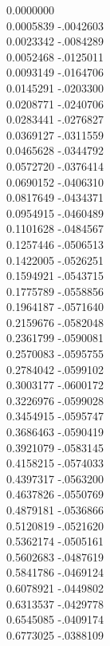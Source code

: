 \documentclass[12pt]{article}
\begin{document}
\begin{multicols}{2}
 0.0000000\\
 0.0005839 -.0042603\\
 0.0023342 -.0084289\\
 0.0052468 -.0125011\\
 0.0093149 -.0164706\\
 0.0145291 -.0203300\\
 0.0208771 -.0240706\\
 0.0283441 -.0276827\\
 0.0369127 -.0311559\\
 0.0465628 -.0344792\\
 0.0572720 -.0376414\\
 0.0690152 -.0406310\\
 0.0817649 -.0434371\\
 0.0954915 -.0460489\\
 0.1101628 -.0484567\\
 0.1257446 -.0506513\\
 0.1422005 -.0526251\\
 0.1594921 -.0543715\\
 0.1775789 -.0558856\\
 0.1964187 -.0571640\\
 0.2159676 -.0582048\\
 0.2361799 -.0590081\\
 0.2570083 -.0595755\\
 0.2784042 -.0599102\\
 0.3003177 -.0600172\\
 0.3226976 -.0599028\\
 0.3454915 -.0595747\\
 0.3686463 -.0590419\\
 0.3921079 -.0583145\\
 0.4158215 -.0574033\\
 0.4397317 -.0563200\\
 0.4637826 -.0550769\\
 0.4879181 -.0536866\\
 0.5120819 -.0521620\\
 0.5362174 -.0505161\\
 0.5602683 -.0487619\\
 0.5841786 -.0469124\\
 0.6078921 -.0449802\\
 0.6313537 -.0429778\\
 0.6545085 -.0409174\\
 0.6773025 -.0388109\\

\end{multicols}
\end{document}

